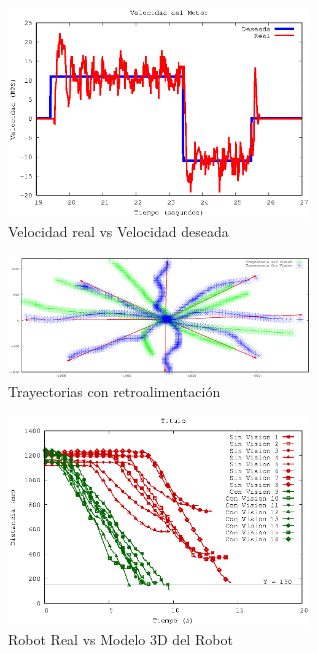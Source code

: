 \documentclass[twocolumn,10pt]{amrob}
\begin{document}
\begin{figure}
  \centering
    \includegraphics[width=8cm]{VelocidadM4.eps}
  \caption{Velocidad real vs Velocidad deseada}
  \label{fig:realVSdes}
\end{figure}
\begin{figure}
  \centering
    \includegraphics[width=8cm]{output1.eps}
  \caption{Trayectorias con retroalimentación}
  \label{fig:visionPruebasRetro}
\end{figure}
\begin{figure}
  \centering
    \includegraphics[width=8cm]{DistErr.eps}
  \caption{Robot Real vs Modelo 3D del Robot}
  \label{fig:errorPlot}
\end{figure}

\end{document}
